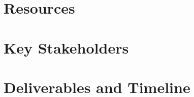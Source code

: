 \documentclass[titlepage]{article}
\begin{document}
\section{Resources}

\section{Key Stakeholders}

\appendix

\section{Deliverables and Timeline}


% 

\end{document}
